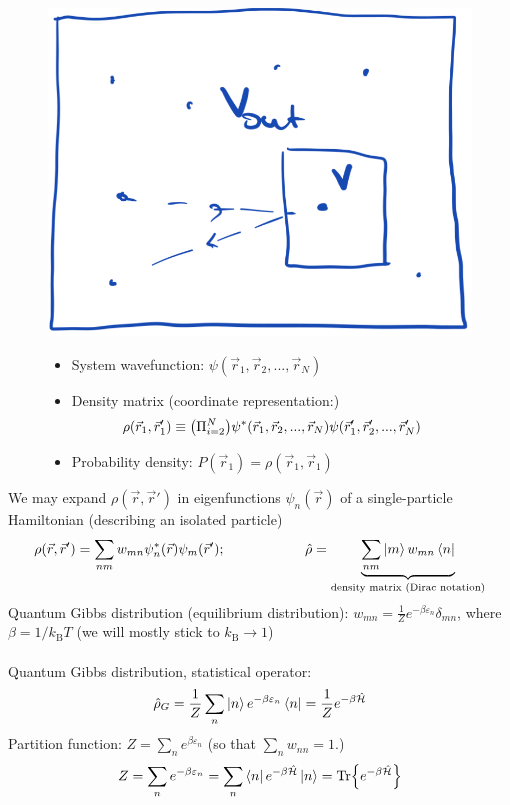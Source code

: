 \documentclass[10pt]{article}
\newcommand{\kb}{k_{\text{B}}}
\newcommand{\Ham}{\hat{\mathcal{H}}}
\newcommand{\smallspace}{\hspace{2cm}}
\begin{document}
\begin{figure}[h]
  \centering
  \begin{minipage}[b]{0.25\textwidth}
    \includegraphics[width = \textwidth]{./figures/ss.png}
  \end{minipage}
  \begin{minipage}[b]{0.65\textwidth}
    \raggedright
    \begin{itemize}
        \item System wavefunction: $\psi(\vec r_1, \vec r_2, ..., \vec r_N)$
        \item Density matrix (coordinate representation:)
            $$\rho(\vec r_1, \vec r_1') \equiv \qty(\Pi_{i=2}^N)\psi^\ast(\vec r_1, \vec r_2, ..., \vec r_N)\psi(\vec r_1', \vec r_2', ..., \vec r_N')$$
        \item Probability density: $P(\vec r_1) = \rho(\vec r_1, \vec r_1)$
            \vspace{.4cm}
    \end{itemize}
  \end{minipage}
  \label{fig:densitymatrix}
\end{figure}
\noindent We may expand $\rho(\vec r, \vec r')$ in eigenfunctions $\psi_n(\vec r)$ of a single-particle Hamiltonian (describing an isolated particle)
$$
\rho(\vec r, \vec r') = \sum_{nm}w_{mn} \psi_n^\ast(\vec r) \psi_m(\vec r'); \smallspace \hat \rho = \underbrace{\sum_{nm}\ket{m}w_{mn}\bra{n}}_{\text{density matrix (Dirac notation)}}
$$
Quantum Gibbs distribution (equilibrium distribution): $\boxed{w_{mn} = \frac{1}{Z}e^{-\beta\varepsilon_n}\delta_{mn}}$, where $\beta = 1/\kb T$ (we will mostly stick to $\kb \to 1$)\\ \\
Quantum Gibbs distribution, statistical operator:
$$
\hat \rho_G = \frac{1}{Z}\sum_n \ket{n} e^{-\beta \varepsilon_n}\bra{n} = \frac{1}{Z}e^{-\beta \Ham}
$$
Partition function: $Z = \sum_{n}e^{\beta \varepsilon_n}$ (so that $\sum_n w_{nn} = 1$.) 
$$
Z = \sum_{n} e^{-\beta \varepsilon_n} = \sum_n \bra{n}e^{-\beta \Ham}\ket{n} = \Tr{e^{-\beta \Ham}}
$$
\end{document}
